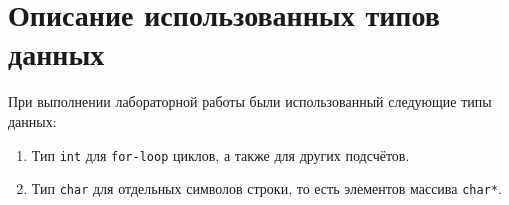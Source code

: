 \section{Описание использованных типов данных}

При выполнении лабораторной работы были использованный следующие типы данных:
\begin{enumerate}
    \item Тип \texttt{int} для \texttt{for-loop} циклов, а также для других подсчётов.
    \item Тип \texttt{char} для отдельных символов строки, то есть элементов массива \texttt{char*}.
\end{enumerate}
